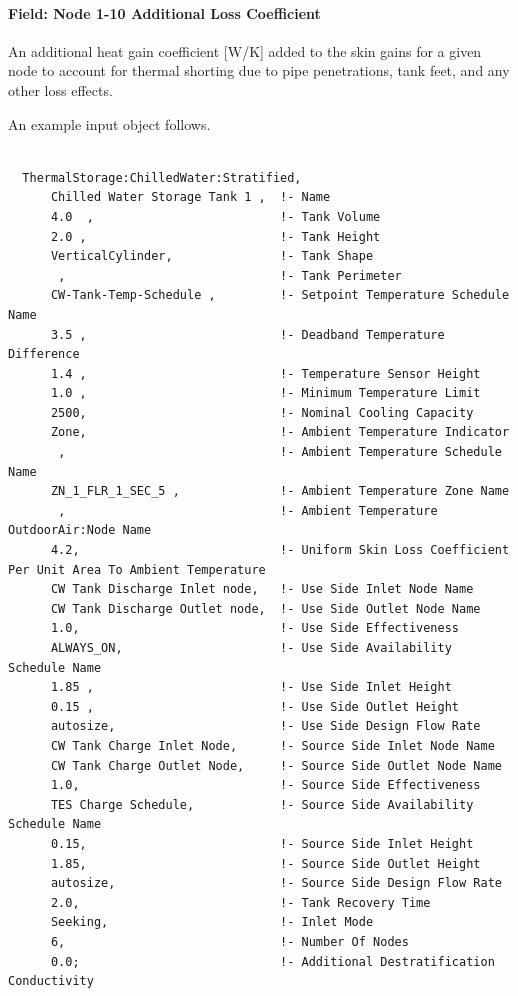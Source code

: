 \paragraph{Field: Node 1-10 Additional Loss Coefficient}\label{field-node-1-10-additional-loss-coefficient}

An additional heat gain coefficient {[}W/K{]} added to the skin gains for a given node to account for thermal shorting due to pipe penetrations, tank feet, and any other loss effects.

An example input object follows.

\begin{lstlisting}

  ThermalStorage:ChilledWater:Stratified,
      Chilled Water Storage Tank 1 ,  !- Name
      4.0  ,                          !- Tank Volume
      2.0 ,                           !- Tank Height
      VerticalCylinder,               !- Tank Shape
       ,                              !- Tank Perimeter
      CW-Tank-Temp-Schedule ,         !- Setpoint Temperature Schedule Name
      3.5 ,                           !- Deadband Temperature Difference
      1.4 ,                           !- Temperature Sensor Height
      1.0 ,                           !- Minimum Temperature Limit
      2500,                           !- Nominal Cooling Capacity
      Zone,                           !- Ambient Temperature Indicator
       ,                              !- Ambient Temperature Schedule Name
      ZN_1_FLR_1_SEC_5 ,              !- Ambient Temperature Zone Name
       ,                              !- Ambient Temperature OutdoorAir:Node Name
      4.2,                            !- Uniform Skin Loss Coefficient Per Unit Area To Ambient Temperature
      CW Tank Discharge Inlet node,   !- Use Side Inlet Node Name
      CW Tank Discharge Outlet node,  !- Use Side Outlet Node Name
      1.0,                            !- Use Side Effectiveness
      ALWAYS_ON,                      !- Use Side Availability Schedule Name
      1.85 ,                          !- Use Side Inlet Height
      0.15 ,                          !- Use Side Outlet Height
      autosize,                       !- Use Side Design Flow Rate
      CW Tank Charge Inlet Node,      !- Source Side Inlet Node Name
      CW Tank Charge Outlet Node,     !- Source Side Outlet Node Name
      1.0,                            !- Source Side Effectiveness
      TES Charge Schedule,            !- Source Side Availability Schedule Name
      0.15,                           !- Source Side Inlet Height
      1.85,                           !- Source Side Outlet Height
      autosize,                       !- Source Side Design Flow Rate
      2.0,                            !- Tank Recovery Time
      Seeking,                        !- Inlet Mode
      6,                              !- Number Of Nodes
      0.0;                            !- Additional Destratification Conductivity
\end{lstlisting}


